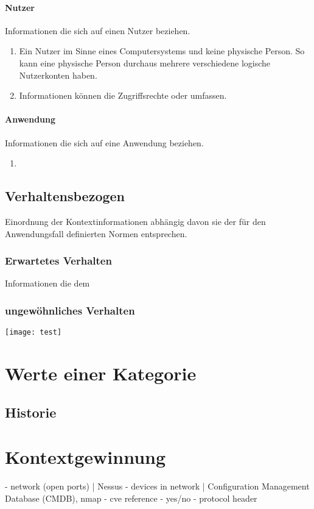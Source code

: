 \paragraph{Nutzer}
Informationen die sich auf einen Nutzer beziehen.
\begin{enumerate}
\item{Ein Nutzer im Sinne eines Computersystems und keine physische Person. So kann eine physische Person durchaus mehrere verschiedene logische Nutzerkonten haben. }
\item{Informationen können die Zugriffsrechte oder %
umfassen.}
\end{enumerate}
\paragraph{Anwendung}
Informationen die sich auf eine Anwendung beziehen.
\begin{enumerate}
\item{}
\end{enumerate}
\subsection{Verhaltensbezogen}
Einordnung der Kontextinformationen abhängig davon sie der für den Anwendungsfall definierten Normen entsprechen.
\subsubsection{Erwartetes Verhalten}
Informationen die dem
\subsubsection{ungewöhnliches Verhalten}
\newpage
\texttt{[image: test]}
\section{Werte einer Kategorie}

\subsection{Historie}
\section{Kontextgewinnung}
- network (open ports) | Nessus
- devices in network | Configuration Management Database (CMDB), nmap   
- cve reference - yes/no
- protocol header

